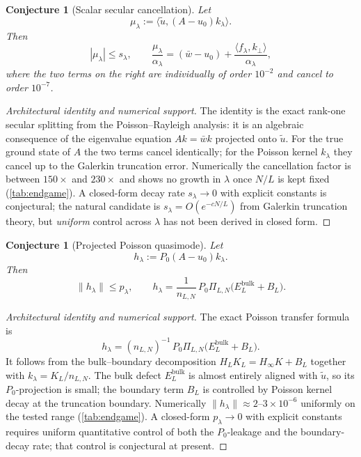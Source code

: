 \documentclass[12pt,a4paper]{article}
\newtheorem{conjecture}[theorem]{Conjecture}
\theoremstyle{definition}
\theoremstyle{remark}
\newcommand{\ip}[2]{\langle #1, #2 \rangle}
\newcommand{\norm}[1]{\| #1 \|}
\newcommand{\utilde}{\tilde{u}}
\begin{document}
\begin{conjecture}[Scalar secular cancellation]
\label{lem:scalar-secular}
Let
\[
  \mu_\lambda := \ip{\utilde}{(A-u_0)k_\lambda}.
\]
Then
\[
  |\mu_\lambda| \le s_\lambda,
  \qquad
  \frac{\mu_\lambda}{\alpha_\lambda}
  =
  (\bar w-u_0)+\frac{\ip{f_\lambda}{k_\perp}}{\alpha_\lambda},
\]
where the two terms on the right are individually of order $10^{-2}$ and
cancel to order $10^{-7}$.
\end{conjecture}

\begin{proof}[Architectural identity and numerical support]
The identity is the exact rank-one secular splitting from the
Poisson--Rayleigh analysis: it is an algebraic consequence of the
eigenvalue equation $Ak = \bar w k$ projected onto $\utilde$.  For the
true ground state of $A$ the two terms cancel identically; for the
Poisson kernel $k_\lambda$ they cancel up to the Galerkin truncation
error.  Numerically the cancellation factor is between $150\times$
and $230\times$ and shows no growth in $\lambda$ once $N/L$ is kept
fixed (\cref{tab:endgame}).  A closed-form decay rate $s_\lambda \to 0$
with explicit constants is conjectural; the natural candidate is
$s_\lambda = O(e^{-cN/L})$ from Galerkin truncation theory, but
\emph{uniform} control across $\lambda$ has not been derived in closed
form.
\end{proof}

\begin{conjecture}[Projected Poisson quasimode]
\label{lem:projected-poisson}
Let
\[
  h_\lambda := P_0(A-u_0)k_\lambda.
\]
Then
\[
  \norm{h_\lambda} \le p_\lambda,
  \qquad
  h_\lambda
  =
  \frac{1}{n_{L,N}}\,P_0\Pi_{L,N}\!\bigl(E_L^{\mathrm{bulk}} + B_L\bigr).
\]
\end{conjecture}

\begin{proof}[Architectural identity and numerical support]
The exact Poisson transfer formula is
\[
  h_\lambda
  = (n_{L,N})^{-1}\,P_0\Pi_{L,N}
    \bigl(E_L^{\mathrm{bulk}} + B_L\bigr).
\]
It follows from the bulk--boundary decomposition
$H_L K_L = H_\infty K + B_L$ together with
$k_\lambda = K_L / n_{L,N}$.  The bulk defect $E_L^{\mathrm{bulk}}$
is almost entirely aligned with $\utilde$, so its $P_0$-projection is
small; the boundary term $B_L$ is controlled by Poisson kernel decay
at the truncation boundary.  Numerically
$\norm{h_\lambda} \approx 2$--$3\times 10^{-6}$ uniformly on the tested
range (\cref{tab:endgame}).  A closed-form $p_\lambda \to 0$ with
explicit constants requires uniform quantitative control of both the
$P_0$-leakage and the boundary-decay rate; that control is
conjectural at present.
\end{proof}
\end{document}
